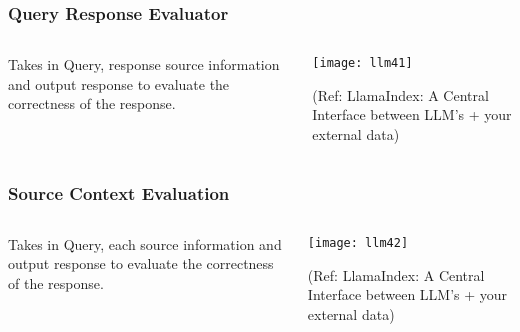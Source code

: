 \begin{frame}[fragile]\frametitle{Query Response Evaluator}

\begin{columns}
    \begin{column}[T]{0.4\linewidth}
Takes in Query, response source information and output response to evaluate the correctness of the response.

    \end{column}
    \begin{column}[T]{0.6\linewidth}
		\begin{center}
		\texttt{[image: llm41]}

		{\tiny (Ref: LlamaIndex: A Central Interface between LLM’s + your external data)}
		\end{center}
    \end{column}
  \end{columns}
\end{frame}


\begin{frame}[fragile]\frametitle{Source Context Evaluation}

\begin{columns}
    \begin{column}[T]{0.4\linewidth}
Takes in Query, each source information and output response to evaluate the correctness of the response.

    \end{column}
    \begin{column}[T]{0.6\linewidth}
		\begin{center}
		\texttt{[image: llm42]}

		{\tiny (Ref: LlamaIndex: A Central Interface between LLM’s + your external data)}
		\end{center}
    \end{column}
  \end{columns}
\end{frame}




